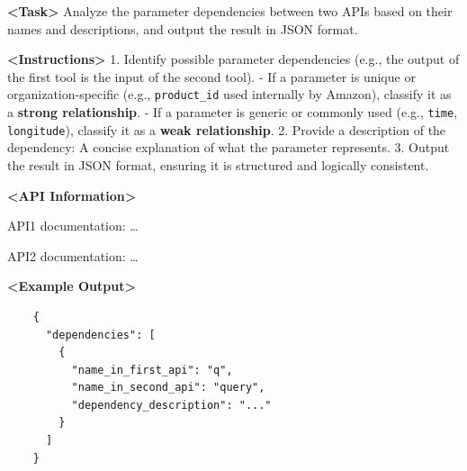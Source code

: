 \begin{center}
    \begin{tcolorbox}[colback=bgcolor, colframe=black, width=0.95\textwidth, boxrule=0.5mm, 
    coltitle=white, colbacktitle=titlecolor, title=Task: Analyze API Dependencies]
    
    
    \textbf{<Task>} Analyze the parameter dependencies between two APIs based on their names and descriptions, and output the result in JSON format.
    
    \textbf{<Instructions>}
    1. Identify possible parameter dependencies (e.g., the output of the first tool is the input of the second tool).  
       - If a parameter is unique or organization-specific (e.g., \texttt{product\_id} used internally by Amazon), classify it as a \textbf{strong relationship}.  
       - If a parameter is generic or commonly used (e.g., \texttt{time}, \texttt{longitude}), classify it as a \textbf{weak relationship}.  
    2. Provide a description of the dependency: A concise explanation of what the parameter represents.  
    3. Output the result in JSON format, ensuring it is structured and logically consistent.  
    
    \vspace{0.5em}
    
    \textbf{<API Information>} 

    API1 documentation: \dots

    API2 documentation: \dots 
    
    \vspace{0.5em}
    
    \textbf{<Example Output>}  
    
    \begin{verbatim}
    {
      "dependencies": [
        {
          "name_in_first_api": "q",
          "name_in_second_api": "query",
          "dependency_description": "..."
        }
      ]
    }
    \end{verbatim}
    
    \end{tcolorbox}
    \end{center}


